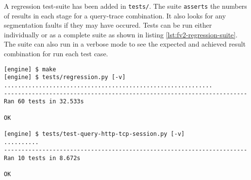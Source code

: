 A regression test-suite has been added in \texttt{tests/}. The suite
\texttt{asserts} the numbers of results in each stage for a query-trace
combination. It also looks for any segmentation faults if they may have
occured. Tests can be run either individually or as a complete
suite as shown in listing \ref{lst:fv2-regression-suite}. The suite can also
run in a verbose mode to see the expected and achieved result combination for
run each test case.

\begin{lstlisting}
[engine] $ make
[engine] $ tests/regression.py [-v]
............................................................
----------------------------------------------------------------------
Ran 60 tests in 32.533s

OK

[engine] $ tests/test-query-http-tcp-session.py [-v]
..........
----------------------------------------------------------------------
Ran 10 tests in 8.672s

OK
\end{lstlisting}
